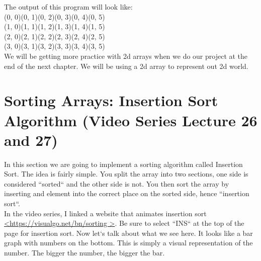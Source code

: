 \documentclass[11]{article}
\begin{document}
The output of this program will look like:\\
(0, 0)(0, 1)(0, 2)(0, 3)(0, 4)(0, 5)\\(1, 0)(1, 1)(1, 2)(1, 3)(1, 4)(1, 5)\\(2, 0)(2, 1)(2, 2)(2, 3)(2, 4)(2, 5)\\(3, 0)(3, 1)(3, 2)(3, 3)(3, 4)(3, 5)\\

We will be getting more practice with 2d arrays when we do our project at the end of the next chapter. We will be using a 2d array to represent out 2d world.

\section{Sorting Arrays: Insertion Sort Algorithm (Video Series Lecture 26 and 27)}
In this section we are going to implement a sorting algorithm called Insertion Sort. The idea is fairly simple. You split the array into two sections, one side is considered ``sorted`` and the other side is not. You then sort the array by inserting and element into the correct place on the sorted side, hence ``insertion sort``.\\

In the video series, I linked a website that animates insertion sort \url{<https://visualgo.net/bn/sorting
>}. Be sure to select ``INS`` at the top of the page for insertion sort. Now let`s talk about what we see here. It looks like a bar graph with numbers on the bottom. This is simply a visual representation of the number. The bigger the number, the bigger the bar.\\
\end{document}
